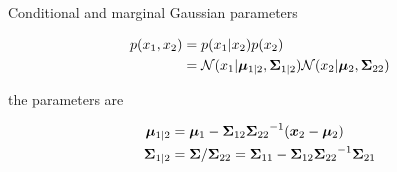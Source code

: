 \begin{thm} Conditional and marginal Gaussian parameters \citep{murphy2012machine} 

\begin{align}
p(x_1, x_2) &= p(x_1 | x_2) p(x_2) \\
&= {\mathcal{N}}(x_1 | {\bm{\mu}}_{1|2}, {{\bm{\Sigma}}_{1|2}}) {\mathcal{N}}(x_2 | {\bm{\mu}}_2, {{\bm{\Sigma}}_{22}})
\end{align}

the parameters are 

\begin{align}
{\bm{\mu}}_{1|2} &= {\bm{\mu}}_1 - {{\bm{\Sigma}}_{12}} {{\bm{\Sigma}}_{22}}^{-1} ({\bm{x}}_2 - {\bm{\mu}}_2) \\
{{\bm{\Sigma}}_{1|2}} &= {\bm{\Sigma}} / {{\bm{\Sigma}}_{22}} = {{\bm{\Sigma}}_{11}} - {{\bm{\Sigma}}_{12}} {{\bm{\Sigma}}_{22}}^{-1} {{\bm{\Sigma}}_{21}}
\end{align}
\end{thm}

